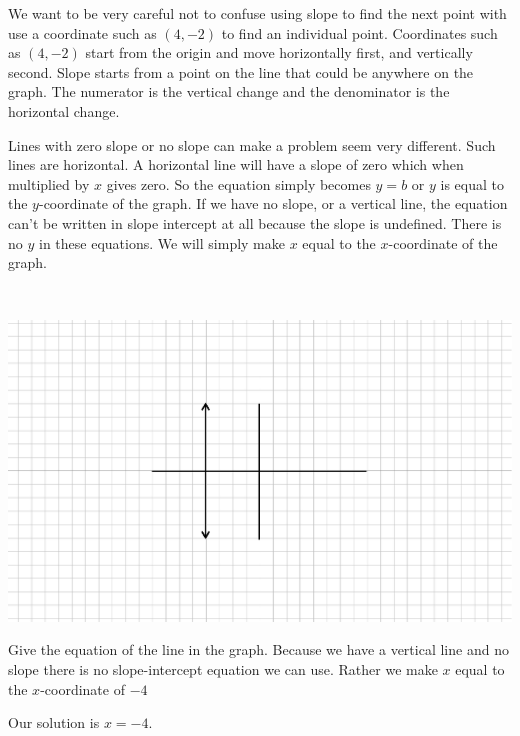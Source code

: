  We want to be very careful not to confuse using slope to find the next point
with use a coordinate such as $(4, - 2)$ to find an individual point.
Coordinates such as $(4, - 2)$ start from the origin and move horizontally
first, and vertically second. Slope starts from a point on the line that could
be anywhere on the graph. The numerator is the vertical change and the
denominator is the horizontal change.\pp

 Lines with zero slope or no slope can make a problem seem very different.  Such lines are horizontal.
A horizontal line will have a slope of zero which when
multiplied by $x$ gives zero. So the equation simply becomes $y = b$ or $y$ is
equal to the $y$-coordinate of the graph. If we have no slope, or a vertical
line, the equation can't be written in slope intercept at all because the
slope is undefined. There is no $y$ in these equations. We will simply make
$x$ equal to the $x$-coordinate of the graph.

\begin{example}\label{Lin61}
~\end{example}
  
  \begin{multicols}{2}
    \includegraphics[scale=.9,bb = 115 65 310 190, clip=true]{II_1_4a-4.eps}
    
Give the equation of the line in the graph.\pp 
Because we have a vertical line and no slope there is no slope-intercept equation we can use.\pp
Rather we make $x$ equal to the $x$-coordinate of $- 4$
  \end{multicols}
	\begin{center}
	    Our solution is $x = - 4$.
	\end{center}
